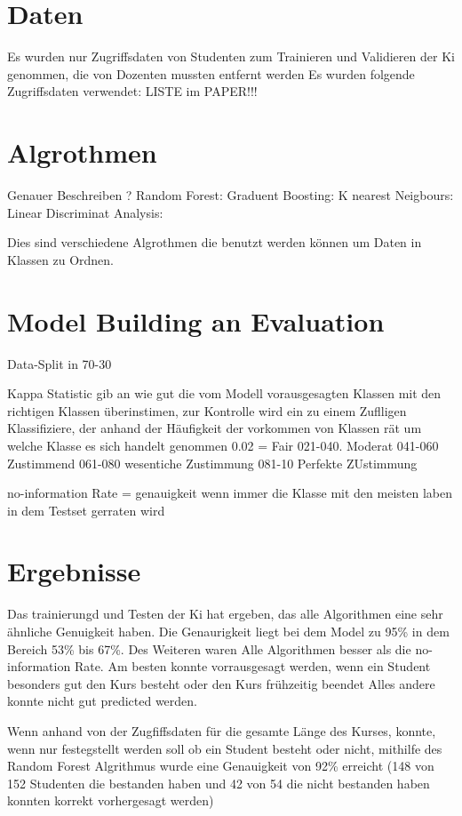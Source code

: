 \section{Daten}
Es wurden nur Zugriffsdaten von Studenten zum Trainieren und Validieren der Ki genommen, die von Dozenten mussten entfernt werden
Es wurden folgende Zugriffsdaten verwendet: LISTE im PAPER!!!

\section{Algrothmen}
Genauer Beschreiben ?
Random Forest:
Graduent Boosting:
K nearest Neigbours:
Linear Discriminat Analysis:

Dies sind verschiedene Algrothmen die benutzt werden können um Daten in Klassen zu Ordnen.

\section{Model Building an Evaluation}
Data-Split in 70-30

Kappa Statistic gib an wie gut die vom Modell vorausgesagten Klassen mit den richtigen Klassen überinstimen, zur Kontrolle wird ein  
zu einem Zuflligen Klassifiziere, der anhand der Häufigkeit der vorkommen von Klassen rät um welche Klasse es sich handelt genommen
0.02 = Fair
021-040. Moderat
041-060 Zustimmend
061-080 wesentiche Zustimmung
081-10 Perfekte ZUstimmung

no-information Rate = genauigkeit wenn immer die Klasse mit den meisten laben in dem Testset gerraten wird

\section{Ergebnisse}
Das trainierungd und Testen der Ki hat ergeben, das alle Algorithmen eine sehr ähnliche Genuigkeit haben.
Die Genaurigkeit liegt bei dem Model zu 95\% in dem Bereich 53\% bis 67\%. Des Weiteren waren Alle
Algorithmen besser als die no-information Rate. Am besten konnte vorrausgesagt werden, wenn ein Student besonders gut den Kurs besteht oder den Kurs frühzeitig beendet
Alles andere konnte nicht gut predicted werden.

Wenn anhand von der Zugfiffsdaten für die gesamte Länge des Kurses, konnte, wenn nur festegstellt werden soll
ob ein Student besteht oder nicht, mithilfe des Random Forest Algrithmus wurde eine Genauigkeit von 92\% erreicht
(148 von 152 Studenten die bestanden haben und 42 von 54 die nicht bestanden haben konnten korrekt vorhergesagt werden)

